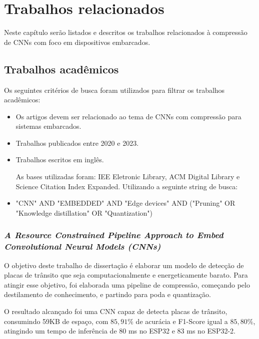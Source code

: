 \chapter{Trabalhos relacionados}\label{cap_trabalhos_relacionados}

Neste capítulo serão listados e descritos os trabalhos relacionados à compressão de CNNs com foco em dispositivos
embarcados.

\section{Trabalhos acadêmicos}

Os seguintes critérios de busca foram utilizados para filtrar os trabalhos acadêmicos:

\begin{itemize}
	\item Os artigos devem ser relacionado ao tema de CNNs com compressão para sistemas embarcados.
	\item Trabalhos publicados entre 2020 e 2023.
	\item Trabalhos escritos em inglês.

	As bases utilizadas foram: IEE Eletronic Library, ACM Digital Library e Science Citation Index Expanded.
	Utilizando a seguinte string de busca:
	\item "CNN"  AND "EMBEDDED" AND "Edge devices" AND ("Pruning" OR "Knowledge distillation" OR "Quantization")
\end{itemize}

\subsection{\textit{A Resource Constrained Pipeline Approach to Embed Convolutional Neural Models (CNNs)}}
O objetivo deste trabalho de dissertação \cite{rafael} é elaborar um modelo de detecção de placas de trânsito que seja
computacionalmente e energeticamente barato. Para atingir esse objetivo, foi elaborada uma pipeline de compressão,
começando pelo destilamento de conhecimento, e partindo para poda e quantização.

O resultado alcançado foi uma CNN capaz de detecta placas de trânsito, consumindo 59KB de espaço, com $85,91\%$ de
acurácia e F1-Score igual a $85,80\%$, atingindo um tempo de inferência de 80 ms no ESP32 e 83 ms no ESP32-2.

